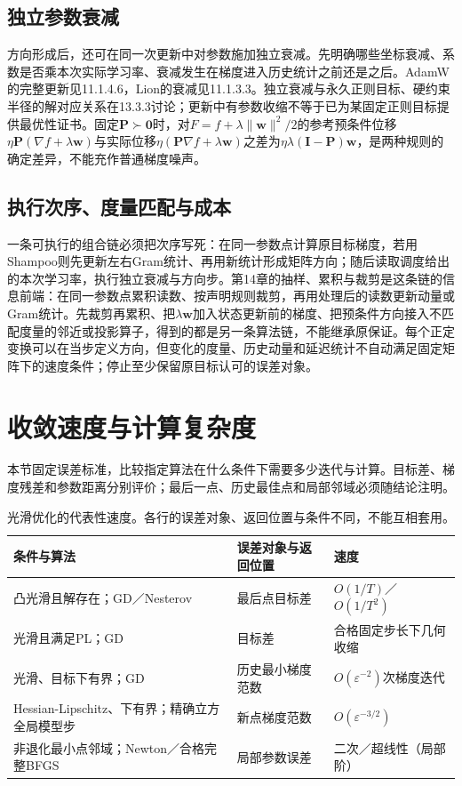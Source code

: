 \subsection{独立参数衰减}

方向形成后，还可在同一次更新中对参数施加独立衰减。先明确哪些坐标衰减、系数是否乘本次实际学习率、衰减发生在梯度进入历史统计之前还是之后。AdamW的完整更新见11.1.4.6，Lion的衰减见11.1.3.3。独立衰减与永久正则目标、硬约束半径的解对应关系在13.3.3讨论；更新中有参数收缩不等于已为某固定正则目标提供最优性证书。固定$\bm P\succ\bm0$时，对$F=f+\lambda\|\bm w\|^2/2$的参考预条件位移$\eta\bm P(\nabla f+\lambda\bm w)$与实际位移$\eta(\bm P\nabla f+\lambda\bm w)$之差为$\eta\lambda(\bm I-\bm P)\bm w$，是两种规则的确定差异，不能充作普通梯度噪声。

\subsection{执行次序、度量匹配与成本}

一条可执行的组合链必须把次序写死：在同一参数点计算原目标梯度，若用Shampoo则先更新左右Gram统计、再用新统计形成矩阵方向；随后读取调度给出的本次学习率，执行独立衰减与方向步。第14章的抽样、累积与裁剪是这条链的信息前端：在同一参数点累积读数、按声明规则裁剪，再用处理后的读数更新动量或Gram统计。先裁剪再累积、把$\lambda\bm w$加入状态更新前的梯度、把预条件方向接入不匹配度量的邻近或投影算子，得到的都是另一条算法链，不能继承原保证。每个正定变换可以在当步定义方向，但变化的度量、历史动量和延迟统计不自动满足固定矩阵下的速度条件；停止至少保留原目标认可的误差对象。

\section{收敛速度与计算复杂度}
\label{sec:opt-rates-complexity}

本节固定误差标准，比较指定算法在什么条件下需要多少迭代与计算。目标差、梯度残差和参数距离分别评价；最后一点、历史最佳点和局部邻域必须随结论注明。

\begin{table}[htbp]
 \centering\small
 \begin{tabularx}{\linewidth}{@{}lXX@{}}
 \toprule
 条件与算法 & 误差对象与返回位置 & 速度 \\
 \midrule
 凸光滑且解存在；GD／Nesterov & 最后点目标差 & $O(1/T)$／$O(1/T^2)$ \\
 光滑且满足PL；GD & 目标差 & 合格固定步长下几何收缩 \\
 光滑、目标下有界；GD & 历史最小梯度范数 & $O(\varepsilon^{-2})$次梯度迭代 \\
 Hessian-Lipschitz、下有界；精确立方全局模型步 & 新点梯度范数 & $O(\varepsilon^{-3/2})$ \\
 非退化最小点邻域；Newton／合格完整BFGS & 局部参数误差 & 二次／超线性（局部阶） \\
 \bottomrule
 \end{tabularx}
 \caption{光滑优化的代表性速度。各行的误差对象、返回位置与条件不同，不能互相套用。}
 \label{tab:opt-smooth-rates}
\end{table}

